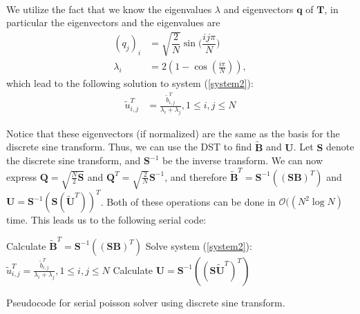 \\
We utilize the fact that we know the eigenvalues $\lambda$ and eigenvectors $\mathbf{q}$ of $\mathbf{T}$, in particular the eigenvectors and the eigenvalues are
\begin{align*}
	(q_j)_i &= \sqrt{\dfrac{2}{N}}\sin \Big( \dfrac{ij\pi}{N}\Big) \\
	\lambda_i &= 2\left(1-\cos\left(\frac{i \pi}{N}\right) \right),
\end{align*}
which lead to the following solution to system (\ref{system2}):
\begin{align*}
\tilde{u}^T_{i,j} &= \frac{\tilde{b}^T_{i,j}}{\lambda_i + \lambda_j}, 1 \leq i, j \leq N
\end{align*}

Notice that these eigenvectors (if normalized) are the same as the basis for the discrete sine transform. Thus, we can use the DST to find $\mathbf{\widetilde{B}}$ and $\mathbf{U}$. Let $\mathbf{S}$ denote the discrete sine transform, and $\mathbf{S}^{-1}$ be the inverse transform. We can now express $\mathbf{Q} = \sqrt{\frac{N}{2}\mathbf{S}}$ and $\mathbf{Q}^T = \sqrt{\frac{2}{N}}\mathbf{S}^{-1}$, and therefore $\mathbf{\widetilde{B}}^T = \mathbf{S}^{-1}((\mathbf{SB})^T)$ and $\mathbf{U} = \mathbf{S}^{-1}(\mathbf{S}(\mathbf{\widetilde{U}}^T))^T$. Both of these operations can be done in $\mathcal{O}((N^2\log{N})$ time. 
This leads us to the following serial code:\\

\begin{algorithm}[H]
 Calculate $\mathbf{\widetilde{B}}^T = \mathbf{S}^{-1}((\mathbf{SB})^T)$  \;
 Solve system (\ref{system2}): $\tilde{u}^T_{i,j} = \frac{\tilde{b}^T_{i,j}}{\lambda_i + \lambda_j}, 1 \leq i, j \leq N$\;
 Calculate $\mathbf{U} = \mathbf{S}^{-1}((\mathbf{S}\mathbf{\tilde{U}}^T)^T)$ \;
 \caption{Pseudocode for serial poisson solver using discrete sine transform.}
 \label{code:serial}
\end{algorithm}